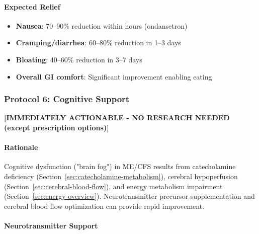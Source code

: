 \paragraph{Expected Relief}
\begin{itemize}
    \item \textbf{Nausea}: 70--90\% reduction within hours (ondansetron)
    \item \textbf{Cramping/diarrhea}: 60--80\% reduction in 1--3 days
    \item \textbf{Bloating}: 40--60\% reduction in 3--7 days
    \item \textbf{Overall GI comfort}: Significant improvement enabling eating
\end{itemize}

\subsubsection{Protocol 6: Cognitive Support}

\textbf{[IMMEDIATELY ACTIONABLE - NO RESEARCH NEEDED (except prescription options)]}

\paragraph{Rationale}
Cognitive dysfunction ("brain fog") in ME/CFS results from catecholamine deficiency (Section~\ref{sec:catecholamine-metabolism}), cerebral hypoperfusion (Section~\ref{sec:cerebral-blood-flow}), and energy metabolism impairment (Section~\ref{sec:energy-overview}). Neurotransmitter precursor supplementation and cerebral blood flow optimization can provide rapid improvement.

\paragraph{Neurotransmitter Support}

